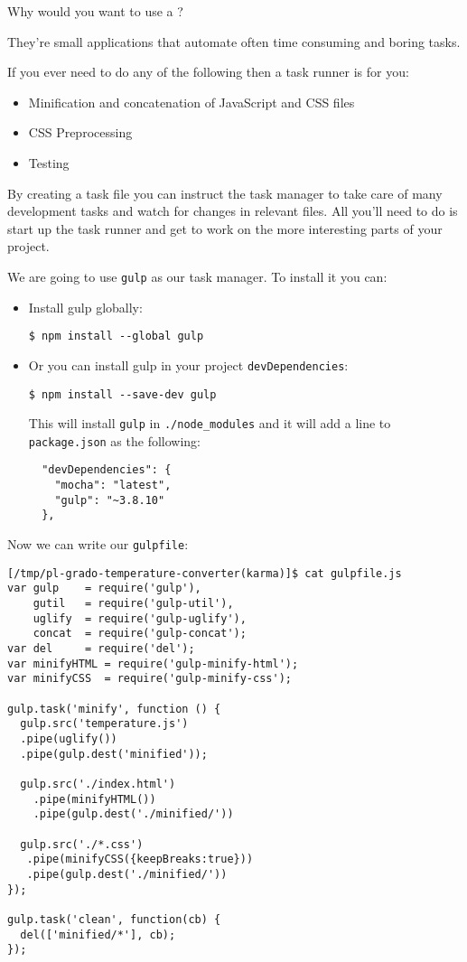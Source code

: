 
Why would you want to use a ? 

They’re small applications that automate often time consuming and boring tasks. 

If you ever need to do any of the following then a task runner is for you:

\begin{itemize}
\item
Minification and concatenation of JavaScript and CSS files
\item
CSS Preprocessing
\item
Testing 
\end{itemize}
By creating a task file you can instruct the task manager to take care of many development tasks and watch for changes in relevant files. All you’ll need to do is start up the task runner and get to work on the more interesting parts of your project.

We are going to use \verb|gulp| as our task manager. To install it you can:

\begin{itemize}
\item
Install gulp globally:

\begin{verbatim}
$ npm install --global gulp
\end{verbatim}
\item
Or you can install gulp in your project \verb|devDependencies|:

\begin{verbatim}
$ npm install --save-dev gulp
\end{verbatim}
This will install \verb|gulp| in \verb|./node_modules| and 
it will add a line to \verb|package.json| as the following:
\begin{verbatim}
  "devDependencies": {
    "mocha": "latest",
    "gulp": "~3.8.10"
  },
\end{verbatim}
\end{itemize}

Now we can write our \verb|gulpfile|:
\begin{verbatim}
[/tmp/pl-grado-temperature-converter(karma)]$ cat gulpfile.js 
var gulp    = require('gulp'),
    gutil   = require('gulp-util'),
    uglify  = require('gulp-uglify'),
    concat  = require('gulp-concat');
var del     = require('del');
var minifyHTML = require('gulp-minify-html');
var minifyCSS  = require('gulp-minify-css');

gulp.task('minify', function () {
  gulp.src('temperature.js')
  .pipe(uglify())
  .pipe(gulp.dest('minified'));

  gulp.src('./index.html')
    .pipe(minifyHTML())
    .pipe(gulp.dest('./minified/'))

  gulp.src('./*.css')
   .pipe(minifyCSS({keepBreaks:true}))
   .pipe(gulp.dest('./minified/'))
});

gulp.task('clean', function(cb) {
  del(['minified/*'], cb);
});
\end{verbatim}

